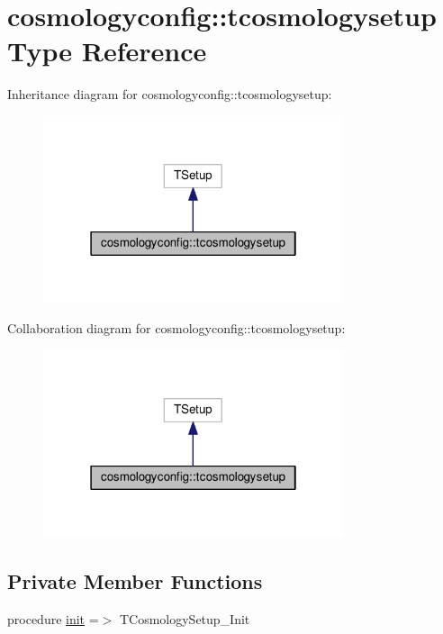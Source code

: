 \hypertarget{structcosmologyconfig_1_1tcosmologysetup}{}\section{cosmologyconfig\+:\+:tcosmologysetup Type Reference}
\label{structcosmologyconfig_1_1tcosmologysetup}


Inheritance diagram for cosmologyconfig\+:\+:tcosmologysetup\+:
\nopagebreak
\begin{figure}[H]
\begin{center}
\leavevmode
\includegraphics[width=250pt]{structcosmologyconfig_1_1tcosmologysetup__inherit__graph}
\end{center}
\end{figure}


Collaboration diagram for cosmologyconfig\+:\+:tcosmologysetup\+:
\nopagebreak
\begin{figure}[H]
\begin{center}
\leavevmode
\includegraphics[width=250pt]{structcosmologyconfig_1_1tcosmologysetup__coll__graph}
\end{center}
\end{figure}
\subsection*{Private Member Functions}
\begin{DoxyCompactItemize}
\item 
procedure \mbox{\hyperlink{structcosmologyconfig_1_1tcosmologysetup_af918816304b620f36adf51d4bbec1675}{init}} =$>$ T\+Cosmology\+Setup\+\_\+\+Init
\end{DoxyCompactItemize}


